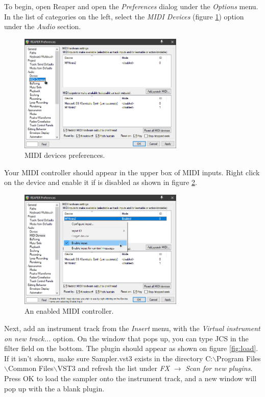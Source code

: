 \documentclass[12pt, a4paper, hidelinks]{article}
\begin{document}
	To begin, open Reaper and open the \textit{Preferences} dialog under the \textit{Options} menu. In the list of categories on the left, select the \textit{MIDI Devices} (figure \ref{fig:udevoff}) option under the \textit{Audio} section. 
	\begin{figure}[h]
		\centering
		\includegraphics[width=0.7\textwidth]{u/dev_off.png}
		\caption{MIDI devices preferences.}
		\label{fig:udevoff}
	\end{figure}
	
	Your MIDI controller should appear in the upper box of MIDI inputs. Right click on the device and enable it if is disabled as shown in figure \ref{fig:udevon}.
	\begin{figure}[h]
		\centering
		\includegraphics[width=0.7\textwidth]{u/dev_on.png}
		\caption{An enabled MIDI controller.}
		\label{fig:udevon}
	\end{figure}
	
	Next, add an instrument track from the \textit{Insert} menu, with the \textit{Virtual instrument on new track...} option. On the window that pops up, you can type JCS in the filter field on the bottom. The plugin should appear as shown on figure \ref{fig:load}. If it isn't shown, make sure Sampler.vst3 exists in the directory C:$\backslash$Program Files$\backslash$Common Files$\backslash$VST3 and refresh the list under \textit{FX} $\rightarrow$ \textit{Scan for new plugins}. Press OK to load the sampler onto the instrument track, and a new window will pop up with the a blank plugin.
	
\end{document}

